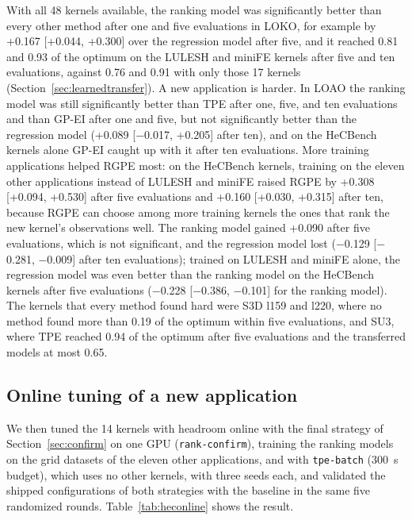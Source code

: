 \documentclass[10pt]{article}
\newcommand{\code}[1]{\texttt{#1}}
\begin{document}
With all 48 kernels available, the ranking model was significantly better than
every other method after one and five evaluations in LOKO, for example by
+0.167 [+0.044, +0.300] over the regression model after five, and it reached
0.81 and 0.93 of the optimum on the LULESH and miniFE kernels after five and ten
evaluations, against 0.76 and 0.91 with only those 17 kernels
(Section~\ref{sec:learnedtransfer}). A new application is harder. In LOAO the
ranking model was still significantly better than TPE after one, five, and ten
evaluations and than GP-EI after one and five, but not significantly better
than the regression model (+0.089 [$-$0.017, +0.205] after ten), and on the
HeCBench kernels alone GP-EI caught up with it after ten evaluations. More training applications helped RGPE most: on the HeCBench
kernels, training on the eleven other applications instead of LULESH and miniFE
raised RGPE by +0.308 [+0.094, +0.530] after five evaluations and +0.160
[+0.030, +0.315] after ten, because RGPE can choose among more training
kernels the ones that rank the new kernel's observations well. The ranking
model gained +0.090 after five evaluations, which is not significant, and the
regression model lost ($-$0.129 [$-$0.281, $-$0.009] after ten evaluations);
trained on LULESH and miniFE alone, the regression model was even better than
the ranking model on the HeCBench kernels after five evaluations ($-$0.228
[$-$0.386, $-$0.101] for the ranking model). The kernels that every method found
hard were S3D l159 and l220, where no method found more than 0.19 of the
optimum within five evaluations, and SU3, where TPE reached 0.94 of the optimum
after five evaluations and the transferred models at most 0.65.

\subsection{Online tuning of a new application}
We then tuned the 14 kernels with headroom online with the final strategy of
Section~\ref{sec:confirm} on one GPU (\code{rank-confirm}), training the ranking
models on the grid datasets of the eleven other applications, and with
\code{tpe-batch} (300~s budget), which uses no other kernels, with three seeds
each, and validated the shipped configurations of both strategies with the
baseline in the same five randomized rounds. Table~\ref{tab:heconline} shows
the result.
\end{document}
